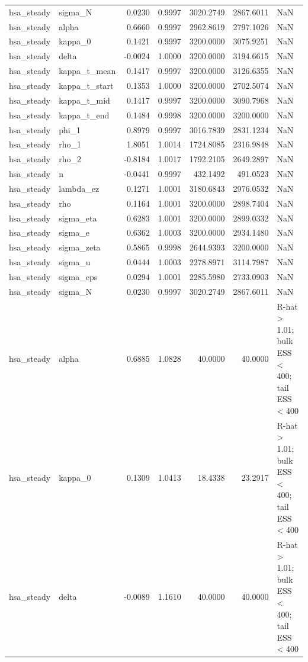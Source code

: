 \begin{tabular}{llrrrrl}
hsa\_steady & sigma\_N & 0.0230 & 0.9997 & 3020.2749 & 2867.6011 & NaN \\
hsa\_steady & alpha & 0.6660 & 0.9997 & 2962.8619 & 2797.1026 & NaN \\
hsa\_steady & kappa\_0 & 0.1421 & 0.9997 & 3200.0000 & 3075.9251 & NaN \\
hsa\_steady & delta & -0.0024 & 1.0000 & 3200.0000 & 3194.6615 & NaN \\
hsa\_steady & kappa\_t\_mean & 0.1417 & 0.9997 & 3200.0000 & 3126.6355 & NaN \\
hsa\_steady & kappa\_t\_start & 0.1353 & 1.0000 & 3200.0000 & 2702.5074 & NaN \\
hsa\_steady & kappa\_t\_mid & 0.1417 & 0.9997 & 3200.0000 & 3090.7968 & NaN \\
hsa\_steady & kappa\_t\_end & 0.1484 & 0.9998 & 3200.0000 & 3200.0000 & NaN \\
hsa\_steady & phi\_1 & 0.8979 & 0.9997 & 3016.7839 & 2831.1234 & NaN \\
hsa\_steady & rho\_1 & 1.8051 & 1.0014 & 1724.8085 & 2316.9848 & NaN \\
hsa\_steady & rho\_2 & -0.8184 & 1.0017 & 1792.2105 & 2649.2897 & NaN \\
hsa\_steady & n & -0.0441 & 0.9997 & 432.1492 & 491.0523 & NaN \\
hsa\_steady & lambda\_ez & 0.1271 & 1.0001 & 3180.6843 & 2976.0532 & NaN \\
hsa\_steady & rho & 0.1164 & 1.0001 & 3200.0000 & 2898.7404 & NaN \\
hsa\_steady & sigma\_eta & 0.6283 & 1.0001 & 3200.0000 & 2899.0332 & NaN \\
hsa\_steady & sigma\_e & 0.6362 & 1.0003 & 3200.0000 & 2934.1480 & NaN \\
hsa\_steady & sigma\_zeta & 0.5865 & 0.9998 & 2644.9393 & 3200.0000 & NaN \\
hsa\_steady & sigma\_u & 0.0444 & 1.0003 & 2278.8971 & 3114.7987 & NaN \\
hsa\_steady & sigma\_eps & 0.0294 & 1.0001 & 2285.5980 & 2733.0903 & NaN \\
hsa\_steady & sigma\_N & 0.0230 & 0.9997 & 3020.2749 & 2867.6011 & NaN \\
hsa\_steady & alpha & 0.6885 & 1.0828 & 40.0000 & 40.0000 & R-hat > 1.01; bulk ESS < 400; tail ESS < 400 \\
hsa\_steady & kappa\_0 & 0.1309 & 1.0413 & 18.4338 & 23.2917 & R-hat > 1.01; bulk ESS < 400; tail ESS < 400 \\
hsa\_steady & delta & -0.0089 & 1.1610 & 40.0000 & 40.0000 & R-hat > 1.01; bulk ESS < 400; tail ESS < 400 \\

\end{tabular}
